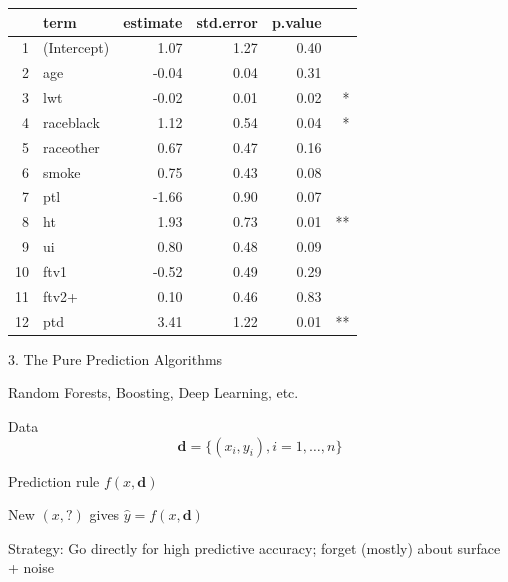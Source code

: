 \begin{frame}[fragile]

\begin{table}[ht]
\centering
\begin{tabular}{rlrrrr}
  \hline
 & term & estimate & std.error & p.value & \\ 
  \hline
1 & (Intercept) & 1.07 & 1.27 & 0.40 \\ 
  2 & age & -0.04 & 0.04 & 0.31 \\ 
  3 & lwt & -0.02 & 0.01 & 0.02 & *\\ 
  4 & raceblack & 1.12 & 0.54 & 0.04 & *\\ 
  5 & raceother & 0.67 & 0.47 & 0.16 \\ 
  6 & smoke & 0.75 & 0.43 & 0.08 \\ 
  7 & ptl & -1.66 & 0.90 & 0.07 \\ 
  8 & ht & 1.93 & 0.73 & 0.01 & **\\ 
  9 & ui & 0.80 & 0.48 & 0.09 \\ 
  10 & ftv1 & -0.52 & 0.49 & 0.29 \\ 
  11 & ftv2+ & 0.10 & 0.46 & 0.83 \\ 
  12 & ptd & 3.41 & 1.22 & 0.01 & **\\ 
   \hline
\end{tabular}
\end{table}

\end{frame}
\begin{frame}[fragile]

\be
\item[3.] The Pure Prediction Algorithms
\ee

\end{frame}
\begin{frame}[fragile]

\bi
\item Random Forests, Boosting, Deep Learning, etc.

\item Data $$\mathbf{d} = \{(x_i,y_i), i=1,\ldots,n\}$$

\item Prediction rule $f(x,\mathbf{d})$

\item New $(x,?)$ gives $\hat{y} = f(x,\mathbf{d})$

\item Strategy: Go directly for high predictive accuracy;
forget (mostly) about surface + noise

\ei

\end{frame}
